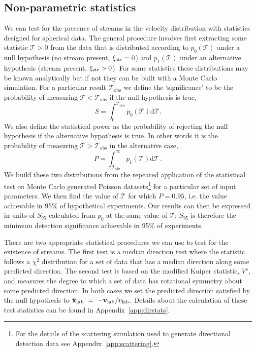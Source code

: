 \subsection{Non-parametric statistics}\label{sec:directional_nonparametric}
We can test for the presence of streams in the velocity distribution with statistics designed for spherical data. The general procedure involves first extracting some statistic $\mathcal{T}>0$ from the data that is distributed according to $p_0(\mathcal{T})$ under a null hypothesis (no stream present, $\xi_{\rm str}=0$) and $p_1(\mathcal{T})$ under an alternative hypothesis (stream present, $\xi_{\rm str}>0$). For some statistics these distributions may be known analytically but if not they can be built with a Monte Carlo simulation. For a particular result $\mathcal{T}_\textrm{obs}$ we define the `significance' to be the probability of measuring $\mathcal{T}<\mathcal{T}_\textrm{obs}$ if the null hypothesis is true,
\begin{equation}\label{eq:significance}
	S = \int_{0}^{\mathcal{T}_\textrm{obs}} p_0(\mathcal{T}) \textrm{d}\mathcal{T}.
\end{equation}   
We also define the statistical power as the probability of rejecting the null hypothesis if the alternative hypothesis is true. In other words it is the probability of measuring $\mathcal{T}>\mathcal{T}_\textrm{obs}$ in the alternative case,
\begin{equation}
	P = \int_{\mathcal{T}_\textrm{obs}}^{\infty} p_1(\mathcal{T})\textrm{d}\mathcal{T} \, .
\end{equation}
We build these two distributions from the repeated application of the statistical test on Monte Carlo generated Poisson datasets\footnote{For the details of the scattering simulation used to generate directional detection data see Appendix~\ref{app:scattering}.} for a particular set of input parameters. We then find the value of $\mathcal{T}$ for which $P=0.95$, i.e. the value achievable in 95\% of hypothetical experiments. Our results can then be expressed in units of $S_{95}$ calculated from $p_0$ at the same value of $\mathcal{T}$; $S_{95}$ is therefore the minimum detection significance achievable in 95\% of experiments.

There are two appropriate statistical procedures we can use to test for the existence of streams. The first test is a median direction test where the statistic follows a $\chi^2$ distribution for a set of data that has a median direction along some predicted direction. The second test is based on the modified Kuiper statistic, $V^\star$, and measures the degree to which a set of data has rotational symmetry about some predicted direction. In both cases we set the predicted direction satisfied by the null hypothesis to $\hat{\textbf{x}}_\textrm{lab}~=~-\textbf{v}_\textrm{lab}/v_{\rm lab}$. Details about the calculation of these test statistics can be found in Appendix~\ref{app:dirstats}.


